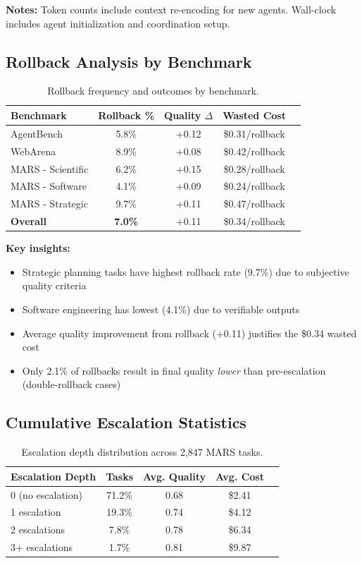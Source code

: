 \documentclass{article}
\theoremstyle{plain}
\theoremstyle{definition}
\theoremstyle{remark}
\begin{document}
\textbf{Notes:} Token counts include context re-encoding for new agents. Wall-clock includes agent initialization and coordination setup.

\subsection{Rollback Analysis by Benchmark}

\begin{table}[h]
\centering
\caption{Rollback frequency and outcomes by benchmark.}
\label{tab:rollback-breakdown}
\small
\begin{tabular}{lcccc}
\toprule
\textbf{Benchmark} & \textbf{Rollback \%} & \textbf{Quality $\Delta$} & \textbf{Wasted Cost} \\
\midrule
AgentBench & 5.8\% & +0.12 & \$0.31/rollback \\
WebArena & 8.9\% & +0.08 & \$0.42/rollback \\
MARS - Scientific & 6.2\% & +0.15 & \$0.28/rollback \\
MARS - Software & 4.1\% & +0.09 & \$0.24/rollback \\
MARS - Strategic & 9.7\% & +0.11 & \$0.47/rollback \\
\midrule
\textbf{Overall} & \textbf{7.0\%} & +0.11 & \$0.34/rollback \\
\bottomrule
\end{tabular}
\end{table}

\textbf{Key insights:}
\begin{itemize}[nosep,leftmargin=*]
\item Strategic planning tasks have highest rollback rate (9.7\%) due to subjective quality criteria
\item Software engineering has lowest (4.1\%) due to verifiable outputs
\item Average quality improvement from rollback (+0.11) justifies the \$0.34 wasted cost
\item Only 2.1\% of rollbacks result in final quality \textit{lower} than pre-escalation (double-rollback cases)
\end{itemize}

\subsection{Cumulative Escalation Statistics}

\begin{table}[h]
\centering
\caption{Escalation depth distribution across 2,847 MARS tasks.}
\label{tab:escalation-depth}
\small
\begin{tabular}{lcccc}
\toprule
\textbf{Escalation Depth} & \textbf{Tasks} & \textbf{Avg. Quality} & \textbf{Avg. Cost} \\
\midrule
0 (no escalation) & 71.2\% & 0.68 & \$2.41 \\
1 escalation & 19.3\% & 0.74 & \$4.12 \\
2 escalations & 7.8\% & 0.78 & \$6.34 \\
3+ escalations & 1.7\% & 0.81 & \$9.87 \\
\bottomrule
\end{tabular}
\end{table}
\end{document}
